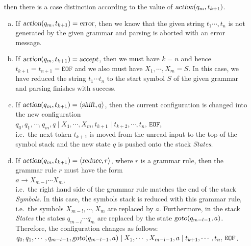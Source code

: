 then there is a case distinction according to the value of $\textsl{action}(q_m, t_{k+1})$.
\begin{enumerate}[(a)]
\item If $\textsl{action}(q_m, t_{k+1}) = \textsl{error}$, then we know that the given string $t_1\cdots,t_n$
      is not generated by the given grammar and parsing is aborted with an error message.
\item If $\textsl{action}(q_m, t_{k+1}) = \textsl{accept}$, then we must have $k=n$ and hence $t_{k+1} = t_{n+1} = \mathtt{EOF}$
      and we also must have $X_1, \cdots, X_m = S$.  In this case, we have reduced the string $t_1\cdots t_n$
      to the start symbol $S$ of the given grammar and parsing finishes with success.
\item If $\textsl{action}(q_m, t_{k+1}) = \langle\textsl{shift}, q \rangle$, then the current configuration
      is changed into the new configuration
      \\[0.2cm]
      \hspace*{1.3cm}
      $q_0, q_1, \cdots, q_m, q \mid X_1, \cdots, X_m, t_{k+1} \mid t_{k+2}, \cdots, t_n, \,\mathtt{EOF}$,
      \\[0.2cm]
      i.e.~the next token $t_{k+1}$ is moved from the unread input to the top of the symbol stack
      and the new state $q$ is pushed onto the stack \textsl{States}.
\item If $\textsl{action}(q_m, t_{k+1}) = \langle\textsl{reduce}, r \rangle$, where $r$ is a grammar rule,
      then the grammar rule $r$ must have the form
      \\[0.2cm]
      \hspace*{1.3cm}
      $a \rightarrow X_{m-l} \cdots X_{m}$,
      \\[0.2cm]
      i.e.~the right hand side of the grammar rule matches the end of the stack \textsl{Symbols}.
      In this case, the symbols stack is reduced with this grammar rule, i.e.~the symbols
      $X_{m-l}, \cdots, X_m$ are replaced by $a$.  Furthermore, in the stack \textsl{States} the states
      $q_{m-l} \cdots q_m$ are replaced by the state $\textsl{goto}(q_{m-l-1}, a)$.
      Therefore, the configuration changes as follows:
      \\[0.2cm]
      \hspace*{1.3cm}
      $q_0, q_1, \cdots, q_{m-l-1}, \textsl{goto}(q_{m-l-1}, a) \mid X_1, \cdots, X_{m-l-1}, a \mid t_{k+1}, \cdots, t_n, \,\mathtt{EOF}$.
\end{enumerate}





